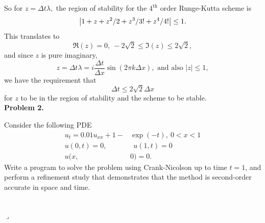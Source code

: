 \documentclass[12pt]{article}
\newenvironment{myprob}[1]
    {%
    \noindent{\Huge$\ulcorner$}\textbf{#1.}\begin{em}
    }
    { 
    \end{em} \\ \hphantom{l} \hfill {\Huge$\lrcorner$} }
\begin{document}
So for $z = \Delta t \lambda,$ the region of stability for the $4^{\text{th}}$ order Runge-Kutta scheme is
$$\abs{1 + z + z^2/2 + z^3/3! + z^4/4!} \leq 1.$$
This translates to $$\Re(z)=0,\  -2\sqrt{2} \leq \Im(z) \leq 2\sqrt{2},$$ 
and since $z$ is pure imaginary, $$z = \Delta t \lambda = i \dfrac{\Delta t}{\Delta x} \sin(2 \pi k \Delta x), \text{ and also } |z| \leq 1,$$
we have the requirement that 
$$ \Delta t \leq 2 \sqrt{2} \Delta x$$
for $z$ to be in the region of stability and the scheme to be stable.\\

\begin{myprob}{Problem 2}
Consider the following PDE
\begin{align*}
u_t = 0.01 u_{xx} + 1 - &\exp(-t), \ 0<x<1 \\
u(0,t)=0, &\ \ u(1,t)=0 \\
u(x,&0) = 0.
\end{align*}
Write a program to solve the problem using Crank-Nicolson up to time $t=1$, and perform a refinement study that demonstrates that the method is second-order accurate in space and time.
\end{myprob}
\end{document}
